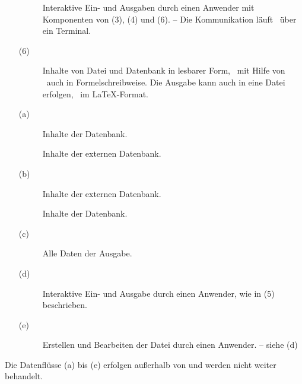 \begin{itemize}
\begin{description}
		\item[]\label{dat-mitAnwender}
		Interaktive Ein- und Ausgaben durch einen Anwender mit Komponenten von (3), (4) und (6).
		-- Die Kommunikation läuft \textiAlg\ über ein Terminal.
	\end{description}
	\item[(6)]\label{dat-Ausgabe}
	\begin{description}
		\item[]\label{dat-inAusgabe}
		Inhalte von Datei und Datenbank in lesbarer Form, \textua\ mit Hilfe von \Ausgabeschemata\ auch in Formelschreibweise.
		Die Ausgabe kann auch in eine Datei erfolgen,
		\textzB\ im \LaTeX-Format.
	\end{description}
	\item[(a)]\label{dat-extInternet}
	\begin{description}
		\item[]\label{dat-ausextInternet}
		Inhalte der Datenbank.
		\item[]\label{dat-inextInternet}
		Inhalte der externen Datenbank.
	\end{description}
	\item[(b)]\label{dat-extDatenbank}
	\begin{description}
		\item[]
		\label{dat-ausextDatenbank} Inhalte der externen Datenbank.
		\item[]
		\label{dat-inextDatenbank} Inhalte der Datenbank.
	\end{description}
	\item[(c)]\label{dat-AusgabeAnwender}
	\begin{description}
		\item[]\label{dat-Ausgabe2Anwender}
		Alle Daten der Ausgabe.
	\end{description}
	\item[(d)] \label{dat-AnwenderTerminal}
	\begin{description}
		\item[]\label{dat-Anwender22Terminal}
		Interaktive Ein- und Ausgabe durch einen Anwender, wie in (5) beschrieben.
	\end{description}
	\item[(e)] \label{dat-TerminalDatei}
	\begin{description}
		\item[]\label{dat-Terminal22Datei}
		Erstellen und Bearbeiten der Datei durch einen Anwender.
		-- siehe (d)
	\end{description}
\end{itemize}
Die Datenflüsse (a) bis (e) erfolgen außerhalb von \ASBA
und werden nicht weiter behandelt.

